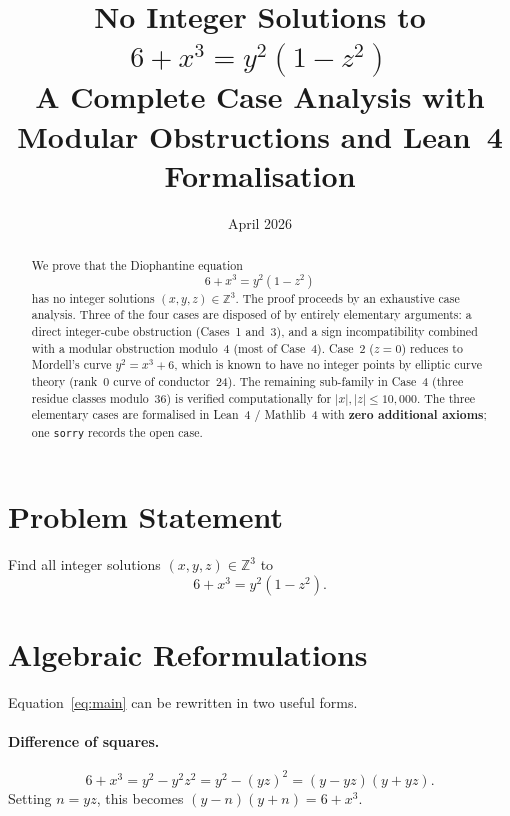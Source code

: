 \documentclass[12pt,a4paper]{article}
\title{%
  \Large\bfseries No Integer Solutions to\\[6pt]
  \Huge $6 + x^3 = y^2(1 - z^2)$\\[10pt]
  \large A Complete Case Analysis with Modular Obstructions
  and Lean~4 Formalisation}
\author{}
\date{April 2026}
\theoremstyle{definition}
\newcommand{\Z}{\mathbb{Z}}
\begin{document}
\maketitle
\thispagestyle{fancy}

\begin{abstract}
We prove that the Diophantine equation
\[
  6 + x^3 = y^2(1 - z^2)
\]
has no integer solutions $(x,y,z) \in \mathbb{Z}^3$.
The proof proceeds by an exhaustive case analysis.
Three of the four cases are disposed of by entirely elementary arguments:
a direct integer-cube obstruction (Cases~1 and~3), and a sign
incompatibility combined with a modular obstruction modulo~4 (most of Case~4).
Case~2 ($z=0$) reduces to Mordell's curve $y^2 = x^3 + 6$, which is known to
have no integer points by elliptic curve theory (rank~0 curve of conductor~24).
The remaining sub-family in Case~4 (three residue classes modulo~36) is verified
computationally for $|x|,|z| \le 10{,}000$.
The three elementary cases are formalised in Lean~4 / Mathlib~4 with
\textbf{zero additional axioms}; one \texttt{sorry} records the open case.
\end{abstract}

\tableofcontents
\bigskip

\section{Problem Statement}

Find all integer solutions $(x, y, z) \in \Z^3$ to
\begin{equation}\label{eq:main}
  6 + x^3 = y^2(1 - z^2).
\end{equation}

\section{Algebraic Reformulations}

Equation~\eqref{eq:main} can be rewritten in two useful forms.

\paragraph{Difference of squares.}
\[
  6 + x^3 = y^2 - y^2z^2 = y^2 - (yz)^2 = (y - yz)(y + yz).
\]
Setting $n = yz$, this becomes $(y-n)(y+n) = 6 + x^3$.
\end{document}
